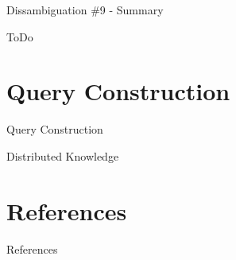 \documentclass{beamer}
\begin{document}
\begin{frame}{Dissambiguation \#9 - Summary}
  \begin{card}
    ToDo
  \end{card}
\end{frame}

\section{Query Construction}

\begin{frame}{Query Construction}
\end{frame}
\begin{frame}{Distributed Knowledge}
\end{frame}

\section{References}

\begin{frame}[allowframebreaks]{References}
    \printbibliography
\end{frame}
\end{document}
